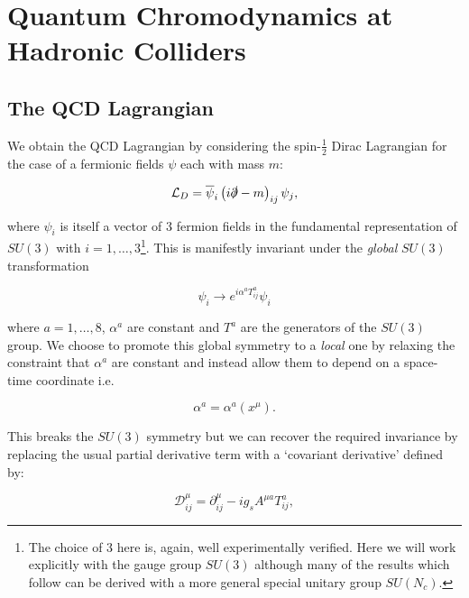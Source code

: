 \chapter{Quantum Chromodynamics at Hadronic Colliders}

	\label{chap:theory}

\section{The QCD Lagrangian}

	We obtain the QCD Lagrangian by considering the spin-$\frac{1}{2}$ Dirac Lagrangian for the case of a
	fermionic fields $\psi$ each with mass $m$:

	\begin{equation}
		\mathcal{L}_D = \overline{\psi}_i\left(i\slashed{\partial}- m\right)_{ij}\psi_j,
		\label{eqn:QCDLagrangian}
	\end{equation}

	\noindent where $\psi_i$ is itself a vector of 3 fermion fields in the fundamental
	representation of $SU(3)$ with $i=1,\ldots,3$\footnote{The choice of 3 here is, again, well experimentally verified.
	Here we will work explicitly with the gauge group $SU(3)$ although many of the results which follow can
	be derived with a more general special unitary group $SU(N_c)$.}. This is manifestly invariant under the \emph{global}
	$SU(3)$ transformation

	\begin{equation}
		\psi_i\rightarrow e^{i\alpha^aT^a_{ij}}\psi_i
	\end{equation}

	\noindent where $a=1,\ldots,8$, $\alpha^a$ are constant and $T^a$ are the generators of the $SU(3)$ group.
	We choose to promote this global symmetry to a \emph{local} one by relaxing the constraint that $\alpha^a$ are
	constant and instead allow them to depend on a space-time coordinate i.e.

	\begin{equation}
		\alpha^a = \alpha^a(x^\mu).
	\end{equation}

	This breaks the $SU(3)$ symmetry but we can recover the required invariance by replacing the
	usual partial derivative term with a `covariant derivative' defined by:

	\begin{equation}
		\mathcal{D}^\mu_{ij} = \partial^\mu_{ij} - ig_sA^{\mu a}T^a_{ij},
	\end{equation}

